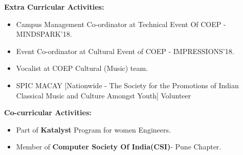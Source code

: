 \documentclass[a4paper,11pt]{article}
\begin{document}
\begin{minipage}[t]{0.5\textwidth}
			\raggedright\smallskip
			\begin{LARGE}
				\Large \textbf{Extra Curricular Activities:}\medskip%
				{\small
					\begin{itemize}
						\item { Campus Management Co-ordinator at Technical Event Of COEP - MINDSPARK'18.}
						\item {Event Co-ordinator at Cultural Event of COEP - IMPRESSIONS'18.}
						\item {Vocalist at COEP Cultural (Music) team.}
						\item {SPIC MACAY [Nationwide - The Society for the Promotions of Indian Classical Music and Culture Amongst Youth] Volunteer }
					\end{itemize}
				}
			\end{LARGE}
			\vspace{0.85cm}

			\begin{LARGE}
				\textbf{Co-curricular Activities:}\medskip%
				{\small
					\begin{itemize}
						\item {Part of \textbf{Katalyst} Program for women Engineers.}
						\item {Member of \textbf{Computer Society Of India(CSI)}- Pune Chapter}.
					\end{itemize}
				}
			\end{LARGE}
			\vspace{0.7cm}
\end{minipage}%
\end{document}
